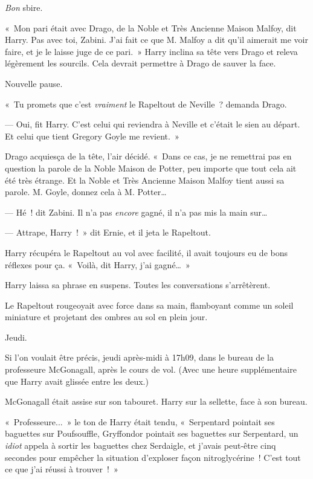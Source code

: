 \emph{Bon} sbire.

«~Mon pari était avec Drago, de la Noble et Très Ancienne Maison Malfoy, dit Harry.
Pas avec toi, Zabini.
J'ai fait ce que M. Malfoy a dit qu'il aimerait me voir faire, et je le laisse juge de ce pari.~»
Harry inclina sa tête vers Drago et releva légèrement les sourcils.
Cela devrait permettre à Drago de sauver la face.

Nouvelle pause.

«~Tu promets que c'est \emph{vraiment} le Rapeltout de Neville~? demanda Drago.

--- Oui, fit Harry.
C'est celui qui reviendra à Neville et c'était le sien au départ.
Et celui que tient Gregory Goyle me revient.~»

Drago acquiesça de la tête, l'air décidé.
«~Dans ce cas, je ne remettrai pas en question la parole de la Noble Maison de Potter, peu importe que tout cela ait été très étrange.
Et la Noble et Très Ancienne Maison Malfoy tient aussi sa parole.
M. Goyle, donnez cela à M. Potter…

--- Hé~! dit Zabini.
Il n'a pas \emph{encore} gagné, il n'a pas mis la main sur…

--- Attrape, Harry~!~»
dit Ernie, et il jeta le Rapeltout.

Harry récupéra le Rapeltout au vol avec facilité, il avait toujours eu de bons réflexes pour ça.
«~Voilà, dit Harry, j'ai gagné…~»

Harry laissa sa phrase en suspens.
Toutes les conversations s'arrêtèrent.

Le Rapeltout rougeoyait avec force dans sa main, flamboyant comme un soleil miniature et projetant des ombres au sol en plein jour.

\later

Jeudi.

Si l'on voulait être précis, jeudi après-midi à 17h09, dans le bureau de la professeure McGonagall, après le cours de vol.
(Avec une heure supplémentaire que Harry avait glissée entre les deux.)

McGonagall était assise sur son tabouret.
Harry sur la sellette, face à son bureau.

«~Professeure...~»
 le ton de Harry était tendu, «~Serpentard pointait ses baguettes sur Poufsouffle, Gryffondor pointait ses baguettes sur Serpentard, un \emph{idiot} appela à sortir les baguettes chez Serdaigle, et j'avais peut-être cinq secondes pour empêcher la situation d'exploser façon nitroglycérine~!
C'est tout ce que j'ai réussi à trouver~!~»

